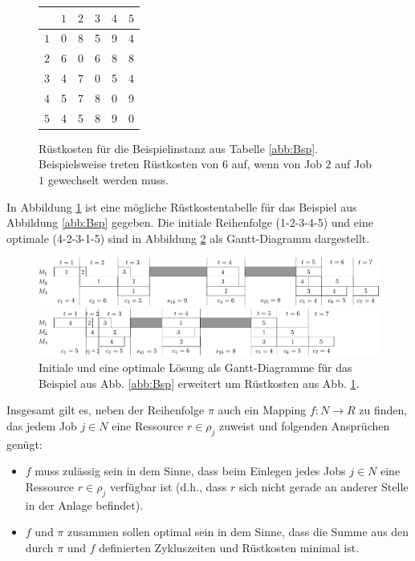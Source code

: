 \documentclass{scrreprt}
\begin{document}
\begin{figure}
    \begin{center}
        \begin{tabular}{c|ccccc}
            & $1$ & $2$ & $3$ & $4$ & $5$ \\ \hline
            $1$ & 0 & 8 & 5 & 9 & 4\\
            $2$ & 6 & 0 & 6 & 8 & 8\\
            $3$ & 4 & 7 & 0 & 5 & 4\\
            $4$ & 5 & 7 & 8 & 0 & 9\\
            $5$ & 4 & 5 & 8 & 9 & 0
        \end{tabular}
    \end{center}
    \caption{
        \label{abb:BspRes}
        Rüstkosten für die Beispielinstanz aus Tabelle \ref{abb:Bsp}.
        Beispielsweise treten Rüstkosten von $6$ auf, wenn von Job $2$ auf Job $1$ gewechselt werden muss.
    }
\end{figure}
In Abbildung \ref{abb:BspRes} ist eine mögliche Rüstkostentabelle für das Beispiel aus Abbildung \ref{abb:Bsp} gegeben.
Die initiale Reihenfolge (1-2-3-4-5) und eine optimale (4-2-3-1-5) sind in Abbildung \ref{abb:ganttres} als Gantt-Diagramm dargestellt.
\begin{figure}
    \begin{center}
        \includegraphics[width=\textwidth]{graphics/bspresinit.pdf}
    \end{center}
    \begin{center}
        \includegraphics[width=\textwidth]{graphics/bspresopt.pdf}
    \end{center}
    \caption{
        \label{abb:ganttres}
        Initiale und eine optimale Lösung als Gantt-Diagramme für das Beispiel aus Abb. \ref{abb:Bsp} erweitert um Rüstkosten aus Abb. \ref{abb:BspRes}.
    }
\end{figure}

Insgesamt gilt es, neben der Reihenfolge $\pi$ auch ein Mapping $f:N\rightarrow R$ zu finden, 
das jedem Job $j\in N$ eine Ressource $r\in\rho_j$ zuweist und folgenden Ansprüchen genügt:
\begin{itemize}
    \item $f$ muss zulässig sein in dem Sinne, dass beim Einlegen jedes Jobs $j\in N$ eine Ressource $r\in\rho_j$ verfügbar ist
        (d.h., dass $r$ sich nicht gerade an anderer Stelle in der Anlage befindet).
    \item $f$ und $\pi$ zusammen sollen optimal sein in dem Sinne, dass die Summe aus den durch $\pi$ und $f$ definierten Zykluszeiten und 
        Rüstkosten minimal ist.
\end{itemize}
\end{document}
